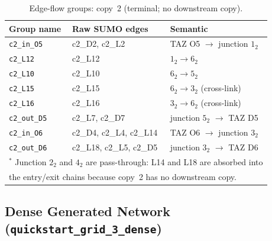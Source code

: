 \documentclass[11pt]{article}
\begin{document}
\begin{table}[h]
\centering
\caption{Edge-flow groups: copy~2 (terminal; no downstream copy).}
\label{tab:groups_grid3_c2}
\begin{tabular}{lll}
\hline
\textbf{Group name} & \textbf{Raw SUMO edges} & \textbf{Semantic} \\
\hline
\texttt{c2\_in\_O5}  & c2\_D2, c2\_L2                     & TAZ O5 $\to$ junction $1_2$ \\
\texttt{c2\_L12}     & c2\_L12                            & $1_2 \to 6_2$ \\
\texttt{c2\_L10}     & c2\_L10                            & $6_2 \to 5_2$ \\
\texttt{c2\_L15}     & c2\_L15                            & $6_2 \to 3_2$ (cross-link) \\
\texttt{c2\_L16}     & c2\_L16                            & $3_2 \to 6_2$ (cross-link) \\
\texttt{c2\_out\_D5} & c2\_L7, c2\_D7                     & junction $5_2$ $\to$ TAZ D5 \\
\texttt{c2\_in\_O6}  & c2\_D4, c2\_L4, c2\_L14            & TAZ O6 $\to$ junction $3_2$\rlap{$^*$} \\
\texttt{c2\_out\_D6} & c2\_L18, c2\_L5, c2\_D5            & junction $3_2$ $\to$ TAZ D6\rlap{$^*$} \\
\hline
\multicolumn{3}{l}{\small $^*$ Junction $2_2$ and $4_2$ are pass-through: L14 and L18 are absorbed into}\\
\multicolumn{3}{l}{\small \phantom{$^*$} the entry/exit chains because copy~2 has no downstream copy.}\\
\hline
\end{tabular}
\end{table}



\subsection{Dense Generated Network (\texttt{quickstart\_grid\_3\_dense})}
\label{subsec:dense-network}
\end{document}
